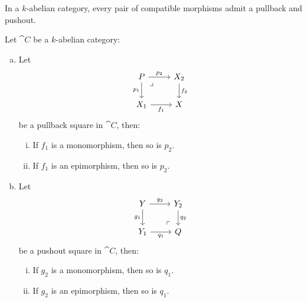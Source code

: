 \begin{corollary}
    \label{cor:abelian-cat-has-all-pullbacks}
    In a \(k\)-abelian category, every pair of compatible morphisms admit a pullback
    and pushout.
\end{corollary}

\begin{lemma}
    \label{lem:pullback-pushout-mono-epi}
    Let \(\cat C\) be a \(k\)-abelian category:
    \begin{enumerate}[(a)]\setlength\itemsep{0em}
        \item Let
              \[
                  \begin{tikzcd}
                      P \ar[r, "p_2"] \ar[d, "p_1"']
                      \ar[rd, phantom, "\lrcorner", very near start]
                      &X_2 \ar[d, "f_2"] \\
                      X_1 \ar[r, "f_1"'] & X
                  \end{tikzcd}
              \]
              be a pullback square in \(\cat C\), then:
              \begin{enumerate}[(i)]\setlength\itemsep{0em}
                  \item If \(f_1\) is a monomorphism, then so is \(p_2\).
                  \item If \(f_1\) is an epimorphism, then so is \(p_2\).
              \end{enumerate}

        \item Let
              \[
                  \begin{tikzcd}
                      Y \ar[r, "g_2"] \ar[d, "g_1"']
                      &Y_2 \ar[d, "q_2"] \\
                      Y_1 \ar[r, "q_1"']
                      & Q \ar[lu, "\ulcorner", phantom, very near start]
                  \end{tikzcd}
              \]
              be a pushout square in \(\cat C\), then:
              \begin{enumerate}[(i)]\setlength\itemsep{0em}
                  \item If \(g_2\) is a monomorphism, then so is \(q_1\).
                  \item If \(g_2\) is an epimorphism, then so is \(q_1\).
              \end{enumerate}
    \end{enumerate}
\end{lemma}

